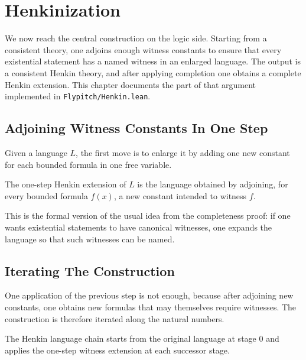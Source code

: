 \chapter{Henkinization}
\label{chap:henkinization}

We now reach the central construction on the logic side. Starting from a
consistent theory, one adjoins enough witness constants to ensure that every
existential statement has a named witness in an enlarged language. The output
is a consistent Henkin theory, and after applying completion one obtains a
complete Henkin extension. This chapter documents the part of that argument
implemented in \texttt{Flypitch/Henkin.lean}.

\section{Adjoining Witness Constants In One Step}

Given a language $L$, the first move is to enlarge it by adding one new
constant for each bounded formula in one free variable.

\begin{definition}
\label{def:henkin-one-step-language}
The one-step Henkin extension of $L$ is the language obtained by adjoining, for
every bounded formula $f(x)$, a new constant intended to witness $f$.
\end{definition}

This is the formal version of the usual idea from the completeness proof: if
one wants existential statements to have canonical witnesses, one expands the
language so that such witnesses can be named.

\section{Iterating The Construction}

One application of the previous step is not enough, because after adjoining new
constants, one obtains new formulas that may themselves require witnesses. The
construction is therefore iterated along the natural numbers.

\begin{definition}
\label{def:henkin-language-chain}
The Henkin language chain starts from the original language at stage $0$ and
applies the one-step witness extension at each successor stage.
\end{definition}

